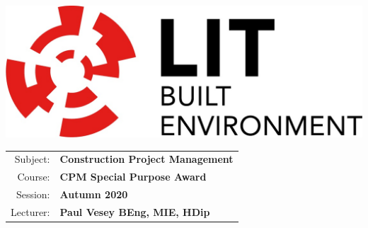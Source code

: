 \documentclass[a4paper, 10pt]{article}
\begin{document}
\lstset{language=HTML,
				basicstyle=\small,
				breaklines=true,
        numbers=left,
        numberstyle=\tiny,
        showstringspaces=false,
        aboveskip=-20pt,
        frame=leftline
        }
				
\begin{table}%
	\begin{minipage}{0.4\textwidth}%
			\includegraphics[width=1\textwidth]{./img/LITlogo.jpg}
	\end{minipage}
	\qquad
	\centering
	\parbox{0.4\textwidth}{
		\begin{large}			
			\begin{tabular}{| r | l |} \hline
				Subject: & \textbf{Construction Project Management}\\
				Course: & \textbf{CPM Special Purpose Award}\\	
				Session: & \textbf{Autumn 2020}\\
				Lecturer: & \textbf{Paul Vesey \footnotesize{BEng, MIE, HDip}}\\
				\hline
			\end{tabular}
		\end{large}			
	}
\end{table}
\vspace{0.25cm}	
\end{document}
